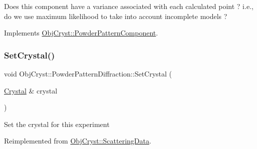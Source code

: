 Does this component have a variance associated with each calculated point ? i.\+e., do we use maximum likelihood to take into account incomplete models ? 

Implements \mbox{\hyperlink{class_obj_cryst_1_1_powder_pattern_component_a773d077df9d066f3d15631ec84ca15fd}{Obj\+Cryst\+::\+Powder\+Pattern\+Component}}.

\mbox{\label{class_obj_cryst_1_1_powder_pattern_diffraction_a5e32e21896fdd947add0cc47fad0bc87}} 
\subsubsection{\texorpdfstring{SetCrystal()}{SetCrystal()}}
{\footnotesize\ttfamily void Obj\+Cryst\+::\+Powder\+Pattern\+Diffraction\+::\+Set\+Crystal (\begin{DoxyParamCaption}\item[{\mbox{\hyperlink{class_obj_cryst_1_1_crystal}{Crystal}} \&}]{crystal }\end{DoxyParamCaption})\hspace{0.3cm}{\ttfamily [virtual]}}

Set the crystal for this experiment 

Reimplemented from \mbox{\hyperlink{class_obj_cryst_1_1_scattering_data_a590a553dbea1970266a864256ebf94f3}{Obj\+Cryst\+::\+Scattering\+Data}}.

